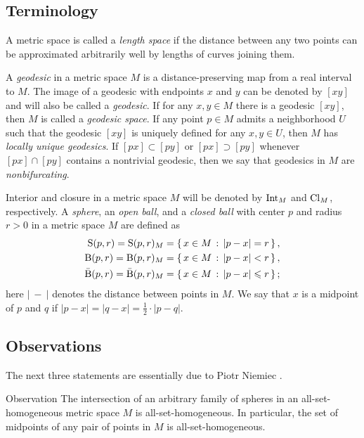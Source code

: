 \documentclass[a4paper,10pt]{article}
\begin{document}
\subsection*{Terminology}

A metric space is called a \emph{length space} if the distance between any two points can be approximated arbitrarily well by lengths of curves joining them.

A \emph{geodesic} in a metric space $M$ is a distance-preserving map from a real interval to $M$.
The image of a geodesic with endpoints $x$ and $y$ can be denoted by $[xy]$ and will also be called a \emph{geodesic}.
If for any $x,y\in M$ there is a geodesic $[xy]$, then $M$ is called a \emph{geodesic space}.
If any point $p\in M$ admits a neighborhood $U$ such that the geodesic $[xy]$ is uniquely defined for any $x,y\in U$,
then $M$ has \emph{locally unique geodesics}.
If $[px]\subset [py]$ or $[px]\supset [py]$ whenever $[px]\cap [py]$ contains a nontrivial geodesic, then we say that geodesics in $M$ are \emph{nonbifurcating}.

Interior and closure in a metric space $M$ will be denoted by $\mathrm{Int}_M$ and $\mathrm{Cl}_M$, respectively.
A \emph{sphere}, an \emph{open ball}, and a \emph{closed ball} with center $p$ and radius $r>0$ in a metric space $M$ are defined as
\begin{align*}
\mathrm{S}(p,r)=\mathrm{S}(p,r)_M&=\left\{\,{x\in M}\,:\,{|p-x|=r}\,\right\},
\\
\mathrm{B}(p,r)=\mathrm{B}(p,r)_M&=\left\{\,{x\in M}\,:\,{|p-x|<r}\,\right\},
\\
\bar{\mathrm{B}}(p,r)=\bar{\mathrm{B}}(p,r)_M&=\left\{\,{x\in M}\,:\,{|p-x|\leqslant  r}\,\right\};
\end{align*}
here $|\ -\ |$ denotes the distance between points in $M$.
We say that $x$ is a midpoint of $p$ and $q$ if $|p-x|=|q-x|=\tfrac12\cdot|p-q|$.

\subsection*{Observations}

The next three statements are essentially due to Piotr Niemiec \cite[3.9, 3.28, 3.31]{niemiec2023}.

\begin{thm}{Observation}\label{obs:spheres}
The intersection of an arbitrary family of spheres in an all-set-homogeneous metric space $M$ is all-set-homogeneous.
In particular, the set of midpoints of any pair of points in $M$ is all-set-homogeneous.
\end{thm}
\end{document}
